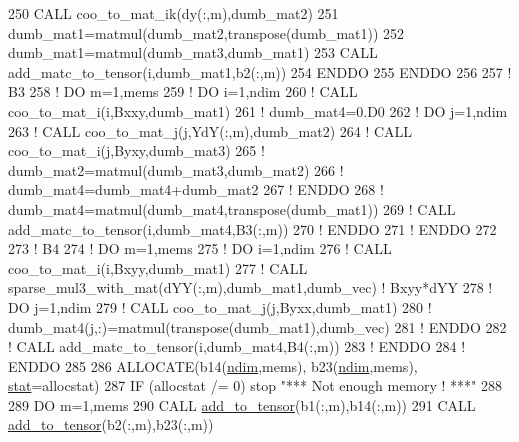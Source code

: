\begin{DoxyCode}
250           \textcolor{keyword}{CALL }coo\_to\_mat\_ik(dy(:,m),dumb\_mat2)
251           dumb\_mat1=matmul(dumb\_mat2,transpose(dumb\_mat1))
252           dumb\_mat1=matmul(dumb\_mat3,dumb\_mat1)
253           \textcolor{keyword}{CALL }add\_matc\_to\_tensor(i,dumb\_mat1,b2(:,m))
254 \textcolor{keywordflow}{       ENDDO}
255 \textcolor{keywordflow}{    ENDDO}
256 
257     \textcolor{comment}{! B3}
258     \textcolor{comment}{! DO m=1,mems}
259     \textcolor{comment}{!    DO i=1,ndim}
260     \textcolor{comment}{!       CALL coo\_to\_mat\_i(i,Bxxy,dumb\_mat1)}
261     \textcolor{comment}{!       dumb\_mat4=0.D0}
262     \textcolor{comment}{!       DO j=1,ndim}
263     \textcolor{comment}{!          CALL coo\_to\_mat\_j(j,YdY(:,m),dumb\_mat2)}
264     \textcolor{comment}{!          CALL coo\_to\_mat\_i(j,Byxy,dumb\_mat3)}
265     \textcolor{comment}{!          dumb\_mat2=matmul(dumb\_mat3,dumb\_mat2)}
266     \textcolor{comment}{!          dumb\_mat4=dumb\_mat4+dumb\_mat2}
267     \textcolor{comment}{!       ENDDO}
268     \textcolor{comment}{!       dumb\_mat4=matmul(dumb\_mat4,transpose(dumb\_mat1))}
269     \textcolor{comment}{!       CALL add\_matc\_to\_tensor(i,dumb\_mat4,B3(:,m))}
270     \textcolor{comment}{!    ENDDO}
271     \textcolor{comment}{! ENDDO}
272 
273     \textcolor{comment}{! B4}
274     \textcolor{comment}{! DO m=1,mems}
275     \textcolor{comment}{!    DO i=1,ndim}
276     \textcolor{comment}{!       CALL coo\_to\_mat\_i(i,Bxyy,dumb\_mat1)}
277     \textcolor{comment}{!       CALL sparse\_mul3\_with\_mat(dYY(:,m),dumb\_mat1,dumb\_vec) ! Bxyy*dYY}
278     \textcolor{comment}{!       DO j=1,ndim}
279     \textcolor{comment}{!          CALL coo\_to\_mat\_j(j,Byxx,dumb\_mat1)}
280     \textcolor{comment}{!          dumb\_mat4(j,:)=matmul(transpose(dumb\_mat1),dumb\_vec)}
281     \textcolor{comment}{!       ENDDO}
282     \textcolor{comment}{!       CALL add\_matc\_to\_tensor(i,dumb\_mat4,B4(:,m))}
283     \textcolor{comment}{!    ENDDO}
284     \textcolor{comment}{! ENDDO}
285 
286     \textcolor{keyword}{ALLOCATE}(b14(\hyperlink{namespaceparams_a2323fe1773f086e20c14f266351c482b}{ndim},mems), b23(\hyperlink{namespaceparams_a2323fe1773f086e20c14f266351c482b}{ndim},mems), \hyperlink{namespacestat}{stat}=allocstat)
287     \textcolor{keywordflow}{IF} (allocstat /= 0) stop \textcolor{stringliteral}{"*** Not enough memory ! ***"}
288 
289     \textcolor{keywordflow}{DO} m=1,mems
290        \textcolor{keyword}{CALL }\hyperlink{namespacetensor_aad7cd55f3a4cec4676cc7ca34b05f1a8}{add\_to\_tensor}(b1(:,m),b14(:,m))
291        \textcolor{keyword}{CALL }\hyperlink{namespacetensor_aad7cd55f3a4cec4676cc7ca34b05f1a8}{add\_to\_tensor}(b2(:,m),b23(:,m))

\end{DoxyCode}
